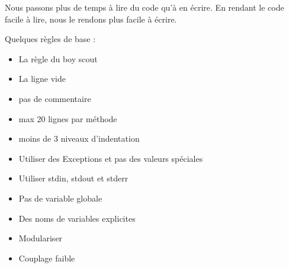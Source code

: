\documentclass[a4paper]{article}
\begin{document}
Nous passons plus de temps à lire du code qu’à en écrire. En rendant le code facile à lire, nous le rendons plus facile à écrire.

Quelques règles de base : 
\begin{itemize}
  \item La règle du boy scout
  \item La ligne vide 
  \item pas de commentaire
  \item max 20 lignes par méthode
  \item moins de 3 niveaux d'indentation
  \item Utiliser des Exceptions et pas des valeurs spéciales
  \item Utiliser stdin, stdout et stderr
  \item Pas de variable globale
  \item Des noms de variables explicites
  \item Modulariser
  \item Couplage faible
\end{itemize}
\end{document}
